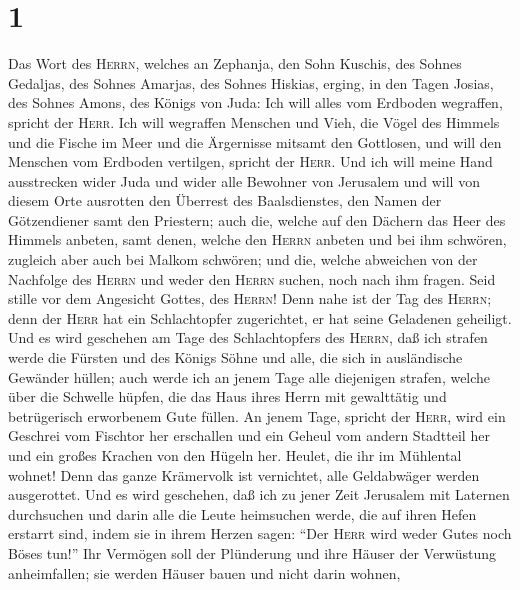 \hypertarget{section}{%
\section{1}\label{section}}

 Das Wort des \textsc{Herrn}, welches an Zephanja, den
Sohn Kuschis, des Sohnes Gedaljas, des Sohnes Amarjas, des Sohnes
Hiskias, erging, in den Tagen Josias, des Sohnes Amons, des Königs von
Juda:  Ich will alles vom Erdboden wegraffen, spricht der
\textsc{Herr}.  Ich will wegraffen Menschen und Vieh, die
Vögel des Himmels und die Fische im Meer und die Ärgernisse mitsamt den
Gottlosen, und will den Menschen vom Erdboden vertilgen, spricht der
\textsc{Herr}.  Und ich will meine Hand ausstrecken wider
Juda und wider alle Bewohner von Jerusalem und will von diesem Orte
ausrotten den Überrest des Baalsdienstes, den Namen der Götzendiener
samt den Priestern;  auch die, welche auf den Dächern das
Heer des Himmels anbeten, samt denen, welche den \textsc{Herrn} anbeten
und bei ihm schwören, zugleich aber auch bei Malkom schwören;
 und die, welche abweichen von der Nachfolge des
\textsc{Herrn} und weder den \textsc{Herrn} suchen, noch nach ihm
fragen.  Seid stille vor dem Angesicht Gottes, des
\textsc{Herrn}! Denn nahe ist der Tag des \textsc{Herrn}; denn der
\textsc{Herr} hat ein Schlachtopfer zugerichtet, er hat seine Geladenen
geheiligt.  Und es wird geschehen am Tage des
Schlachtopfers des \textsc{Herrn}, daß ich strafen werde die Fürsten und
des Königs Söhne und alle, die sich in ausländische Gewänder hüllen;
 auch werde ich an jenem Tage alle diejenigen strafen,
welche über die Schwelle hüpfen, die das Haus ihres Herrn mit
gewalttätig und betrügerisch erworbenem Gute füllen.  An
jenem Tage, spricht der \textsc{Herr}, wird ein Geschrei vom Fischtor
her erschallen und ein Geheul vom andern Stadtteil her und ein großes
Krachen von den Hügeln her.  Heulet, die ihr im Mühlental
wohnet! Denn das ganze Krämervolk ist vernichtet, alle Geldabwäger
werden ausgerottet.  Und es wird geschehen, daß ich zu
jener Zeit Jerusalem mit Laternen durchsuchen und darin alle die Leute
heimsuchen werde, die auf ihren Hefen erstarrt sind, indem sie in ihrem
Herzen sagen: ``Der \textsc{Herr} wird weder Gutes noch Böses tun!''
 Ihr Vermögen soll der Plünderung und ihre Häuser der
Verwüstung anheimfallen; sie werden Häuser bauen und nicht darin wohnen,
